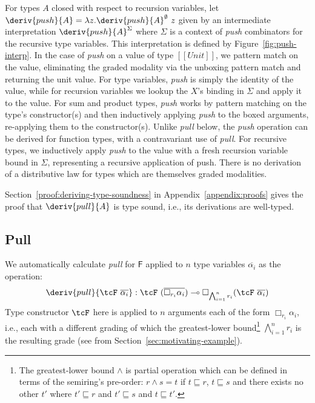 For types $A$ closed with respect to recursion variables, let $\deriv{push}{A} =
\lambda z . \deriv{push}{A}^\emptyset\ z$ given by an intermediate
interpretation $\deriv{push}{A}^\Sigma$ where $\Sigma$ is a context of
\textit{push} combinators for the recursive type variables. This interpretation
is defined by Figure~\ref{fig:push-interp}.
%
In the case of \emph{push} on a value of type $[[ Unit ]]$, we pattern match on
the value, eliminating the graded modality via the unboxing pattern match and
returning the unit value. For type variables, \emph{push} is simply the identity
of the value, while for recursion variables we lookup the $X$'s binding in
$\Sigma$ and apply it to the value. For sum and product types, \emph{push} works
by pattern matching on the type's constructor(s) and then inductively applying
\emph{push} to the boxed arguments, re-applying them to the constructor(s).
Unlike \emph{pull} below, the \emph{push} operation can be derived for function
types, with a contravariant use of \emph{pull}. For recursive types, we
inductively apply \emph{push} to the value with a fresh recursion variable bound
in $\Sigma$, representing a recursive application of push. There is no
derivation of a distributive law for types which are themselves graded
modalities.

Section~\ref{proof:deriving-type-soundness} in Appendix~\ref{appendix:proofs}
gives the proof that $\deriv{pull}{A}$ is type sound, i.e., its derivations are
well-typed.

\subsection{Pull}
We automatically
calculate \emph{pull} for $\mathsf{F}$
applied to $n$ type variables
$\overline{\alpha_i}$
as the operation:
\begin{align*}
\deriv{pull}{\tcF\ \overline{\alpha_i}} : \tcF\ (\overline{\Box_{r_i} \alpha_i})
\multimap \Box_{\bigwedge^n_{i = 1} r_i} (\tcF\  \overline{\alpha_i})
 \end{align*}
Type constructor $\tcF$ here is applied to $n$ arguments each of the form
$\Box_{r_i} \alpha_i$, i.e., each with a different grading of which the
greatest-lower bound\footnote{The greatest-lower bound $\wedge$ is partial
operation which can be defined in terms of the semiring's pre-order: $r \wedge s
= t$ if $t \sqsubseteq r$, $t \sqsubseteq s$ and there exists no other $t'$
where $t' \sqsubseteq r$ and $t' \sqsubseteq s$ and $t \sqsubseteq t'$.}
$\bigwedge^n_{i = 1} r_i$ is the resulting grade (see  from
Section~\ref{sec:motivating-example}).

